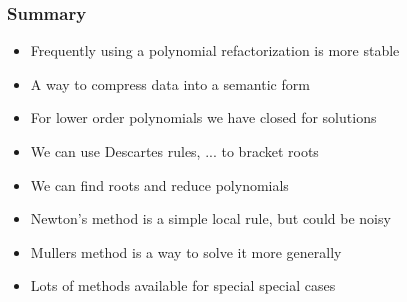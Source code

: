 \documentclass[10pt]{beamer}
\begin{document}
\begin{frame}
  \frametitle{Summary}
  \begin{itemize}
  \item Frequently using a polynomial refactorization is more stable
  \item A way to compress data into a semantic form
  \item For lower order polynomials we have closed for solutions
  \item We can use Descartes rules, ... to bracket roots
  \item We can find roots and reduce polynomials
  \item Newton's method is a simple local rule, but could be noisy
  \item Mullers method is a way to solve it more generally 
  \item Lots of methods available for special special cases
  \end{itemize}
\end{frame}
\end{document}
